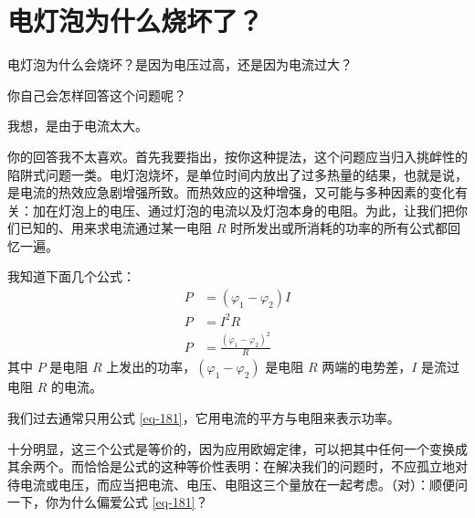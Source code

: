 
\chapter[电灯泡为什么烧坏了？]{电灯泡为什么烧坏了？\label{ch-30}}

\begin{dialogue}

\stda 电灯泡为什么会烧坏？是因为电压过高，还是因为电流过大？

\tchr 你自己会怎样回答这个问题呢？

\stda 我想，是由于电流太大。

\tchr 你的回答我不太喜欢。首先我要指出，按你这种提法，这个问题应当归入挑衅性的陷阱式问题一类。电灯泡烧坏，是单位时间内放出了过多热量的结果，也就是说，是电流的热效应急剧增强所致。而热效应的这种增强，又可能与多种因素的变化有关：加在灯泡上的电压、通过灯泡的电流以及灯泡本身的电阻。为此，让我们把你们已知的、用来求电流通过某一电阻 $R$ 时所发出或所消耗的功率的所有公式都回忆一遍。

\stdb 我知道下面几个公式：
\begin{align}%
P & = (\varphi_{1} -\varphi_{2})I \label{eq-180}\\
P & =I^{2} R \label{eq-181}\\
P & = \frac{ \left( \varphi_{1} -\varphi_{2} \right)^{2}}{R} \label{eq-182}
\end{align}
其中 $P$ 是电阻 $R$ 上发出的功率，$(\varphi_{1} -\varphi_{2})$ 是电阻 $R$ 两端的电势差，$I$ 是流过电阻 $R$ 的电流。

\stda 我们过去通常只用公式 \eqref{eq-181}，它用电流的平方与电阻来表示功率。

\tchr 十分明显，这三个公式是等价的，因为应用欧姆定律，可以把其中任何一个变换成其余两个。而恰恰是公式的这种等价性表明：在解决我们的问题时，不应孤立地对待电流或电压，而应当把电流、电压、电阻这三个量放在一起考虑。（对）：顺便问一下，你为什么偏爱公式 \eqref{eq-181}？


\end{dialogue}
